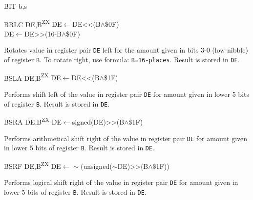 \documentclass[twoside,openright,a4paper]{book}
\newcommand{\ZXN}{\textnormal{\textsuperscript{ZX}}}
\begin{document}
\begin{basedescript}{
	\desclabelstyle{\multilinelabel}
	\desclabelwidth{3cm}}
\begin{detailitem}{BIT b,s}
	\end{detailitem}

	\begin{detailitem}{BRLC DE,B\ZXN}
		{DE$\leftarrow$DE<<(B$\wedge$\$0F)\\
		DE$\leftarrow$DE>>(16-B$\wedge$\$0F)}

		Rotates value in register pair {\tt DE} left for the amount given in bits 3-0 (low nibble) of register {\tt B}. To rotate right, use formula: {\tt B=16-places}. Result is stored in {\tt DE}.

		\DetailNoEffect

		\begin{DetailTiming}
		\end{DetailTiming}

	\end{detailitem}

	\begin{detailitem}{BSLA DE,B\ZXN}
		{DE$\leftarrow$DE<<(B$\wedge$\$1F)}

		Performs shift left of the value in register pair {\tt DE} for amount given in lower 5 bits of register {\tt B}. Result is stored in {\tt DE}.

		\DetailNoEffect
		
		\begin{DetailTiming}
			\DetailTime{}{2}{8}
		\end{DetailTiming}

	\end{detailitem}

	\begin{detailitem}{BSRA DE,B\ZXN}
		{DE$\leftarrow$signed(DE)>>(B$\wedge$\$1F)}

		Performs arithmetical shift right of the value in register pair {\tt DE} for amount given in lower 5 bits of register {\tt B}. Result is stored in {\tt DE}.

		\DetailNoEffect
		
		\begin{DetailTiming}
		\end{DetailTiming}

	\end{detailitem}

	\begin{detailitem}{BSRF DE,B\ZXN}
		{DE$\leftarrow\sim$(unsigned($\sim$DE)>>(B$\wedge$\$1F))}

		Performs logical shift right of the value in register pair {\tt DE} for amount given in lower 5 bits of register {\tt B}. Result is stored in {\tt DE}.


\end{detailitem}
\end{basedescript}
\end{document}

